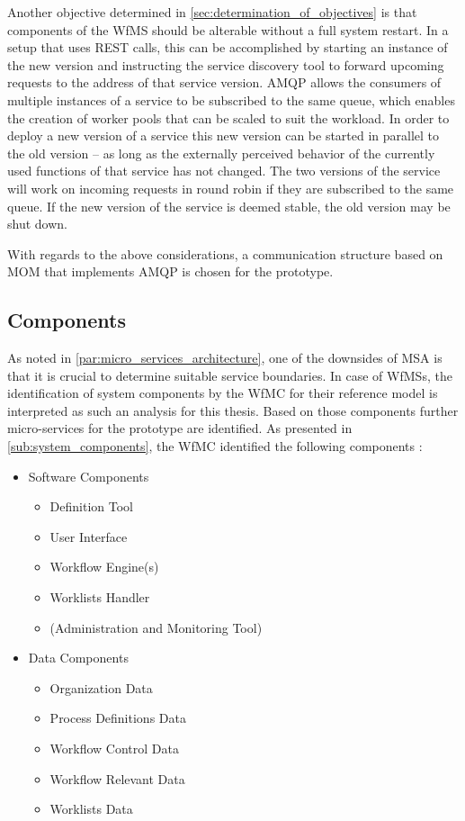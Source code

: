   Another objective determined in \ref{sec:determination_of_objectives} is that components of the \ac{WfMS} should be alterable without a full system restart.
  In a setup that uses \ac{REST} calls, this can be accomplished by starting an instance of the new version and instructing the service discovery tool to forward upcoming requests to the address of that service version.
  \ac{AMQP} allows the consumers of multiple instances of a service to be subscribed to the same queue, which enables the creation of worker pools that can be scaled to suit the workload.
  In order to deploy a new version of a service this new version can be started in parallel to the old version -- as long as the externally perceived behavior of the currently used functions of that service has not changed. The two versions of the service will work on incoming requests in round robin if they are subscribed to the same queue. If the new version of the service is deemed stable, the old version may be shut down.

  With regards to the above considerations, a communication structure based on \ac{MOM} that implements \ac{AMQP} is chosen for the prototype.

\subsection{Components} %
  \label{sub:components}
  As noted in \ref{par:micro_services_architecture}, one of the downsides of \ac{MSA} is that it is crucial to determine suitable service boundaries. In case of \acp{WfMS}, the identification of system components by the \ac{WfMC} for their reference model is interpreted as such an analysis for this thesis. Based on those components further micro-services for the prototype are identified. As presented in \ref{sub:system_components}, the \ac{WfMC} identified the following components \cite[p.~13]{Hollingsworth1995Wfmc}:
    \begin{itemize}[nosep]
      \item Software Components
        \begin{itemize}[nosep]
          \item Definition Tool %
          \item User Interface
          \item Workflow Engine(s)
          \item Worklists Handler %
          \item (Administration and Monitoring Tool) %
        \end{itemize}
      \item Data Components
        \begin{itemize}[nosep]
          \item Organization Data %
          \item Process Definitions Data %
          \item Workflow Control Data
          \item Workflow Relevant Data %
          \item Worklists Data %
        \end{itemize}
    \end{itemize}

